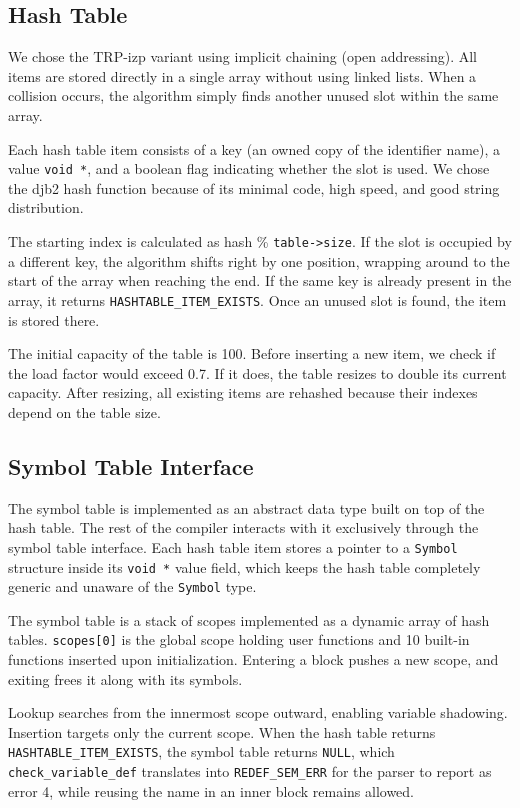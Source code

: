\documentclass[12pt,a4paper]{article}
\begin{document}
\subsection{Hash Table}
We chose the TRP-izp variant using implicit chaining (open addressing). All items are stored directly in a single array without using linked lists. When a collision occurs, the algorithm simply finds another unused slot within the same array.

Each hash table item consists of a key (an owned copy of the identifier name), a value \texttt{void *}, and a boolean flag indicating whether the slot is used. We chose the djb2 hash function \cite{djb2} because of its minimal code, high speed, and good string distribution.

The starting index is calculated as hash \% \texttt{table->size}. If the slot is occupied by a different key, the algorithm shifts right by one position, wrapping around to the start of the array when reaching the end. If the same key is already present in the array, it returns \texttt{HASHTABLE\_ITEM\_EXISTS}. Once an unused slot is found, the item is stored there.

The initial capacity of the table is 100. Before inserting a new item, we check if the load factor would exceed 0.7. If it does, the table resizes to double its current capacity. After resizing, all existing items are rehashed because their indexes depend on the table size. 

\subsection{Symbol Table Interface}
The symbol table is implemented as an abstract data type built on top of the hash table. The rest of the compiler interacts with it exclusively through the symbol table interface. Each hash table item stores a pointer to a \texttt{Symbol} structure inside its \texttt{void *} value field, which keeps the hash table completely generic and unaware of the \texttt{Symbol} type.

The symbol table is a stack of scopes implemented as a dynamic array of hash tables. \texttt{scopes[0]} is the global scope holding user functions and 10 built-in functions inserted upon initialization. Entering a block pushes a new scope, and exiting frees it along with its symbols.

Lookup searches from the innermost scope outward, enabling variable shadowing. Insertion targets only the current scope. When the hash table returns \\ \texttt{HASHTABLE\_ITEM\_EXISTS}, the symbol table returns \texttt{NULL}, which \texttt{check\_variable\_def} translates into \texttt{REDEF\_SEM\_ERR} for the parser to report as error 4, while reusing the name in an inner block remains allowed.
\end{document}
